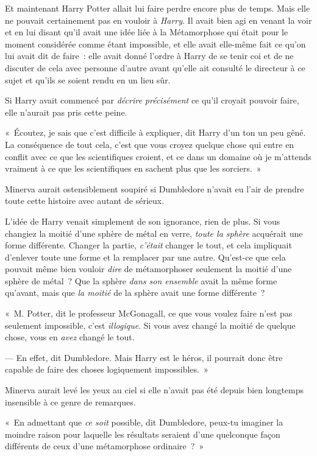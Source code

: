 Et maintenant Harry Potter allait lui faire perdre encore plus de temps. Mais elle ne pouvait certainement pas en vouloir à \emph{Harry}. Il avait bien agi en venant la voir et en lui disant qu'il avait une idée liée à la Métamorphose qui était pour le moment considérée comme étant impossible, et elle avait elle-même fait ce qu'on lui avait dit de faire~: elle avait donné l'ordre à Harry de se tenir coi et de ne discuter de cela avec personne d'autre avant qu'elle ait consulté le directeur à ce sujet et qu'ils se soient rendu en un lieu sûr.

Si Harry avait commencé par \emph{décrire précisément} ce qu'il croyait pouvoir faire, elle n'aurait pas pris cette peine.

«~Écoutez, je sais que c'est difficile à expliquer, dit Harry d'un ton un peu gêné. La conséquence de tout cela, c'est que vous croyez quelque chose qui entre en conflit avec ce que les scientifiques croient, et ce dans un domaine où je m'attends vraiment à ce que les scientifiques en sachent plus que les sorciers.~»

Minerva aurait ostensiblement soupiré si Dumbledore n'avait eu l'air de prendre toute cette histoire avec autant de sérieux.

L'idée de Harry venait simplement de son ignorance, rien de plus. Si vous changiez la moitié d'une sphère de métal en verre, \emph{toute la sphère} acquérait une forme différente. Changer la partie, \emph{c'était} changer le tout, et cela impliquait d'enlever toute une forme et la remplacer par une autre. Qu'est-ce que cela pouvait même bien vouloir \emph{dire} de métamorphoser seulement la moitié d'une sphère de métal~? Que la sphère \emph{dans son ensemble} avait la même forme qu'avant, mais que \emph{la moitié} de la sphère avait une forme différente~?

«~M. Potter, dit le professeur McGonagall, ce que vous voulez faire n'est pas seulement impossible, c'est \emph{illogique}. Si vous avez changé la moitié de quelque chose, vous en \emph{avez} changé le tout.

--- En effet, dit Dumbledore. Mais Harry est le héros, il pourrait donc être capable de faire des choses logiquement impossibles.~»

Minerva aurait levé les yeux au ciel si elle n'avait pas été depuis bien longtemps insensible à ce genre de remarques.

«~En admettant que \emph{ce soit} possible, dit Dumbledore, peux-tu imaginer la moindre raison pour laquelle les résultats seraient d'une quelconque façon différents de ceux d'une métamorphose ordinaire~?~»


